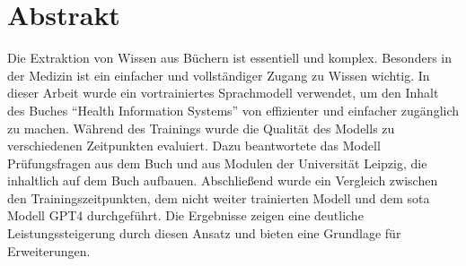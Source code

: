 \chapter*{Abstrakt}
Die Extraktion von Wissen aus Büchern ist essentiell und komplex.
Besonders in der Medizin ist ein einfacher und vollständiger Zugang zu Wissen wichtig.
In dieser Arbeit wurde ein vortrainiertes Sprachmodell verwendet, um den Inhalt des Buches \enquote{Health Information Systems} von \citet{bb} effizienter und einfacher zugänglich zu machen.
Während des Trainings wurde die Qualität des Modells zu verschiedenen Zeitpunkten evaluiert.
Dazu beantwortete das Modell Prüfungsfragen aus dem Buch und aus Modulen der Universität Leipzig, die inhaltlich auf dem Buch aufbauen.
Abschließend wurde ein Vergleich zwischen den Trainingszeitpunkten, dem nicht weiter trainierten Modell und dem \ac{sota} Modell GPT4 durchgeführt.
Die Ergebnisse zeigen eine deutliche Leistungssteigerung durch diesen Ansatz und bieten eine Grundlage für Erweiterungen.
\vfill
